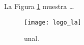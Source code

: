 \documentclass{article}
\begin{document}
La Figura \ref{fig:logo} 
muestra \ldots

\begin{figure}
\centering
\texttt{[image: logo\_la]}
\caption{\label{fig:logo} unal.}
\end{figure}
\end{document}
